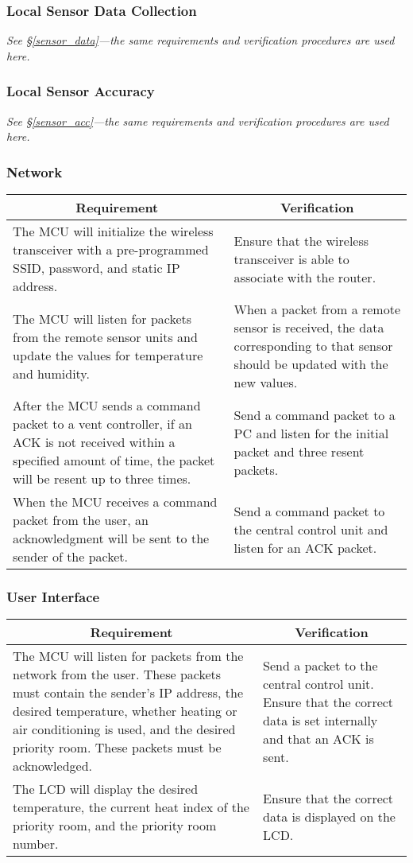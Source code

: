 \subsubsection{Local Sensor Data Collection}
{\em See \S \ref{sensor_data}---the same requirements and verification procedures are used here.}
\subsubsection{Local Sensor Accuracy}
{\em See \S \ref{sensor_acc}---the same requirements and verification procedures are used here.}

\subsubsection{Network}
\begin{tabular}{|p{\mytabwidth}|p{\mytabwidth}|}
\hline
\multicolumn{1}{|c|}{Requirement} & \multicolumn{1}{|c|}{Verification} \\
\hline\hline
The MCU will initialize the wireless transceiver with a pre-programmed SSID, password, and static IP address. &
Ensure that the wireless transceiver is able to associate with the router. \\
\hline
The MCU will listen for packets from the remote sensor units and update the values for temperature and humidity. &
When a packet from a remote sensor is received, the data corresponding to that sensor should be updated with the new values. \\
\hline
After the MCU sends a command packet to a vent controller, if an ACK is not received within a specified amount of time, the packet will be resent up to three times. &
Send a command packet to a PC and listen for the initial packet and three resent packets. \\
\hline
When the MCU receives a command packet from the user, an acknowledgment will be sent to the sender of the packet. &
Send a command packet to the central control unit and listen for an ACK packet. \\
\hline
\end{tabular}

\subsubsection{User Interface}
\begin{tabular}{|p{\mytabwidth}|p{\mytabwidth}|}
\hline
\multicolumn{1}{|c|}{Requirement} & \multicolumn{1}{|c|}{Verification} \\
\hline\hline
The MCU will listen for packets from the network from the user.  These packets must contain the sender's IP address, the desired temperature, whether heating or air conditioning is used, and the desired priority room.  These packets must be acknowledged. &
Send a packet to the central control unit.  Ensure that the correct data is set internally and that an ACK is sent. \\
\hline
The LCD will display the desired temperature, the current heat index of the priority room, and the priority room number. &
Ensure that the correct data is displayed on the LCD. \\
\hline
\end{tabular}

